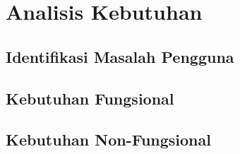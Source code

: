 \section{Analisis Kebutuhan}
\label{sec:analisis-kebutuhan}

\subsection{Identifikasi Masalah Pengguna}
\label{subsec:identifikasi-masalah-pengguna}

\subsection{Kebutuhan Fungsional}
\label{subsec:kebutuhan-fungsional}

\subsection{Kebutuhan Non-Fungsional}
\label{subsec:kebutuhan-non-fungsional}